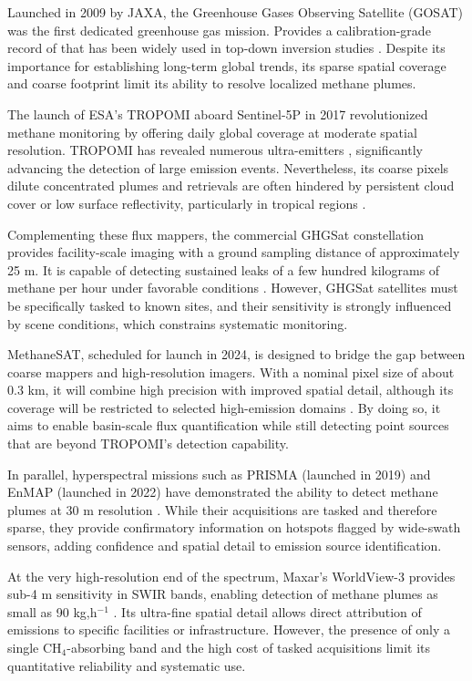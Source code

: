 Launched in 2009 by JAXA, the Greenhouse Gases Observing Satellite (GOSAT) was the first dedicated greenhouse gas mission. Provides a calibration-grade record of  that has been widely used in top-down inversion studies \cite{Parker2020, Jacob2022}. Despite its importance for establishing long-term global trends, its sparse spatial coverage and coarse footprint limit its ability to resolve localized methane plumes.

The launch of ESA's TROPOMI aboard Sentinel-5P in 2017 revolutionized methane monitoring by offering daily global coverage at moderate spatial resolution. TROPOMI has revealed numerous ultra-emitters \cite{Pandey2019, Lauvaux2022}, significantly advancing the detection of large emission events. Nevertheless, its coarse pixels dilute concentrated plumes and retrievals are often hindered by persistent cloud cover or low surface reflectivity, particularly in tropical regions \cite{Jacob2022, Lorente2021}.

Complementing these flux mappers, the commercial GHGSat constellation provides facility-scale imaging with a ground sampling distance of approximately 25 m. It is capable of detecting sustained leaks of a few hundred kilograms of methane per hour under favorable conditions \cite{Varon2019, Varon2020}. However, GHGSat satellites must be specifically tasked to known sites, and their sensitivity is strongly influenced by scene conditions, which constrains systematic monitoring.

MethaneSAT, scheduled for launch in 2024, is designed to bridge the gap between coarse mappers and high-resolution imagers. With a nominal pixel size of about 0.3 km, it will combine high precision with improved spatial detail, although its coverage will be restricted to selected high-emission domains \cite{Jacob2022}. By doing so, it aims to enable basin-scale flux quantification while still detecting point sources that are beyond TROPOMI's detection capability.

In parallel, hyperspectral missions such as PRISMA (launched in 2019) and EnMAP (launched in 2022) have demonstrated the ability to detect methane plumes at 30 m resolution \cite{Guanter2021, Sherwin2024}. While their acquisitions are tasked and therefore sparse, they provide confirmatory information on hotspots flagged by wide-swath sensors, adding confidence and spatial detail to emission source identification.

At the very high-resolution end of the spectrum, Maxar's WorldView-3 provides sub-4 m sensitivity in SWIR bands, enabling detection of methane plumes as small as 90 kg,h$^{-1}$ \cite{Sanchez2022}. Its ultra-fine spatial detail allows direct attribution of emissions to specific facilities or infrastructure. However, the presence of only a single CH$_4$-absorbing band and the high cost of tasked acquisitions limit its quantitative reliability and systematic use.

